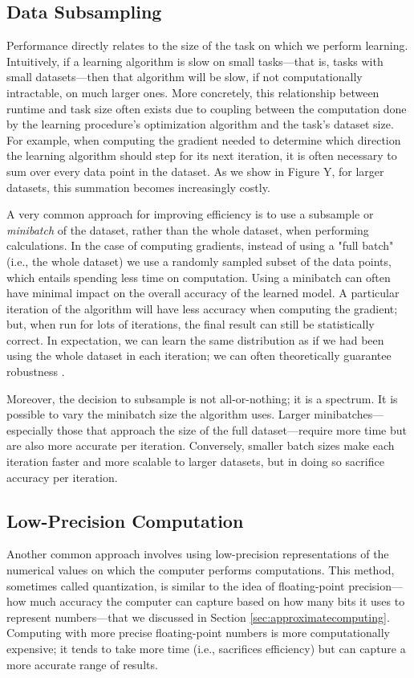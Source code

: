 \documentclass[sigplan,screen]{acmart}
\begin{document}
\subsection{Data Subsampling} \label{sec:subsampling}
Performance directly relates to the size of the task on which we perform learning. Intuitively, if a learning algorithm is slow on small tasks---that is, tasks with small datasets---then that algorithm will be slow, if not computationally intractable, on much larger ones. More concretely, this relationship between runtime and task size often exists due to coupling between the computation done by the learning procedure's optimization algorithm and the task's dataset size. For example, when computing the gradient needed to determine which direction the learning algorithm should step for its next iteration, it is often necessary to sum over every data point in the dataset. As we show in Figure \color{red}Y\color{black}, for larger datasets, this summation becomes increasingly costly.

A very common approach for improving efficiency is to use a subsample or \emph{minibatch} of the dataset, rather than the whole dataset, when performing calculations. In the case of computing gradients, instead of using a "full batch" (i.e., the whole dataset) we use a randomly sampled subset of the data points, which entails spending less time on computation. Using a minibatch can often have minimal impact on the overall accuracy of the learned model. A particular iteration of the algorithm will have less accuracy when computing the gradient; but, when run for lots of iterations, the final result can still be statistically correct. In expectation, we can learn the same distribution as if we had been using the whole dataset in each iteration; we can often theoretically guarantee robustness \cite{Kiefer1952StochasticEO, Bottou2018sgd}.

Moreover, the decision to subsample is not all-or-nothing; it is a spectrum. It is possible to vary the minibatch size the algorithm uses. Larger minibatches---especially those that approach the size of the full dataset---require more time but are also more accurate per iteration. Conversely, smaller batch sizes make each iteration faster and more scalable to larger datasets, but in doing so sacrifice accuracy per iteration.

\subsection{Low-Precision Computation} \label{sec:quantization}
Another common approach involves using low-precision representations of the numerical values on which the computer performs computations. This method, sometimes called quantization, is similar to the idea of floating-point precision---how much accuracy the computer can capture based on how many bits it uses to represent numbers---that we discussed in Section \ref{sec:approximatecomputing}. Computing with more precise floating-point numbers is more computationally expensive; it tends to take more time (i.e., sacrifices efficiency) but can capture a more accurate range of results.
\end{document}
